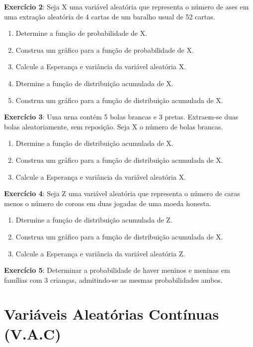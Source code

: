 \documentclass[a4paper,12pt]{report}
\begin{document}
{%

\textbf{Exercício 2}: Seja X uma variável aleatória que representa
o número de ases em uma extração aleatória de 4 cartas de um
baralho usual de 52 cartas.

\begin{enumerate}
    \item Determine a função de probabilidade de X.
    \item Construa um gráfico para a função de probabilidade de X.
    \item Calcule a Esperança e variância da variável aleatória X.
    \item Dtermine a função de distribuição acumulada de X.
    \item Construa um gráfico para a função de distribuição acumulada de X.
\end{enumerate}

\textbf{Exercício 3}: Uma urna contém 5 bolas brancas e 3 pretas.
Extraem-se duas bolas aleatoriamente, sem reposição. Seja X o
número de bolas brancas.

\begin{enumerate}
    \item Dtermine a função de distribuição acumulada de X.
    \item Construa um gráfico para a função de distribuição acumulada de X.
    \item Calcule a Esperança e variância da variável aleatória X.
\end{enumerate}

\textbf{Exercício 4}: Seja Z uma variável aleatória que representa
o número de caras menos o número de coroas em duas jogadas de uma
moeda honesta.

\begin{enumerate}
    \item Dtermine a função de distribuição acumulada de Z.
    \item Construa um gráfico para a função de distribuição acumulada de X.
    \item Calcule a Esperança e variância da variável aleatória Z.
\end{enumerate}

\textbf{Exercício 5}: Determinar a probabilidade de haver meninos
e meninas em famílias com 3 crianças, admitindo-se as mesmas
probabilidades ambos.

\newpage

\section{Variáveis Aleatórias Contínuas (V.A.C)}

}
\end{document}
